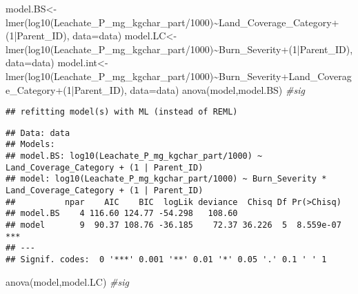 \documentclass[
]{article}
\newenvironment{Shaded}{\begin{snugshade}}{\end{snugshade}}
\newcommand{\AttributeTok}[1]{\textcolor[rgb]{0.77,0.63,0.00}{#1}}
\newcommand{\CommentTok}[1]{\textcolor[rgb]{0.56,0.35,0.01}{\textit{#1}}}
\newcommand{\DecValTok}[1]{\textcolor[rgb]{0.00,0.00,0.81}{#1}}
\newcommand{\FunctionTok}[1]{\textcolor[rgb]{0.00,0.00,0.00}{#1}}
\newcommand{\NormalTok}[1]{#1}
\newcommand{\OtherTok}[1]{\textcolor[rgb]{0.56,0.35,0.01}{#1}}
\newcommand{\SpecialCharTok}[1]{\textcolor[rgb]{0.00,0.00,0.00}{#1}}
\begin{document}
\begin{Shaded}
\begin{Highlighting}[]
\NormalTok{model.BS}\OtherTok{\textless{}{-}}\FunctionTok{lmer}\NormalTok{(}\FunctionTok{log10}\NormalTok{(Leachate\_P\_mg\_kgchar\_part}\SpecialCharTok{/}\DecValTok{1000}\NormalTok{)}\SpecialCharTok{\textasciitilde{}}\NormalTok{Land\_Coverage\_Category}\SpecialCharTok{+}\NormalTok{(}\DecValTok{1}\SpecialCharTok{|}\NormalTok{Parent\_ID), }\AttributeTok{data=}\NormalTok{data)}
\NormalTok{model.LC}\OtherTok{\textless{}{-}}\FunctionTok{lmer}\NormalTok{(}\FunctionTok{log10}\NormalTok{(Leachate\_P\_mg\_kgchar\_part}\SpecialCharTok{/}\DecValTok{1000}\NormalTok{)}\SpecialCharTok{\textasciitilde{}}\NormalTok{Burn\_Severity}\SpecialCharTok{+}\NormalTok{(}\DecValTok{1}\SpecialCharTok{|}\NormalTok{Parent\_ID), }\AttributeTok{data=}\NormalTok{data)}
\NormalTok{model.int}\OtherTok{\textless{}{-}}\FunctionTok{lmer}\NormalTok{(}\FunctionTok{log10}\NormalTok{(Leachate\_P\_mg\_kgchar\_part}\SpecialCharTok{/}\DecValTok{1000}\NormalTok{)}\SpecialCharTok{\textasciitilde{}}\NormalTok{Burn\_Severity}\SpecialCharTok{+}\NormalTok{Land\_Coverage\_Category}\SpecialCharTok{+}\NormalTok{(}\DecValTok{1}\SpecialCharTok{|}\NormalTok{Parent\_ID), }\AttributeTok{data=}\NormalTok{data)}
\FunctionTok{anova}\NormalTok{(model,model.BS) }\CommentTok{\#sig}
\end{Highlighting}
\end{Shaded}

\begin{verbatim}
## refitting model(s) with ML (instead of REML)
\end{verbatim}

\begin{verbatim}
## Data: data
## Models:
## model.BS: log10(Leachate_P_mg_kgchar_part/1000) ~ Land_Coverage_Category + (1 | Parent_ID)
## model: log10(Leachate_P_mg_kgchar_part/1000) ~ Burn_Severity * Land_Coverage_Category + (1 | Parent_ID)
##          npar    AIC    BIC  logLik deviance  Chisq Df Pr(>Chisq)    
## model.BS    4 116.60 124.77 -54.298   108.60                         
## model       9  90.37 108.76 -36.185    72.37 36.226  5  8.559e-07 ***
## ---
## Signif. codes:  0 '***' 0.001 '**' 0.01 '*' 0.05 '.' 0.1 ' ' 1
\end{verbatim}

\begin{Shaded}
\begin{Highlighting}[]
\FunctionTok{anova}\NormalTok{(model,model.LC) }\CommentTok{\#sig}
\end{Highlighting}
\end{Shaded}
\end{document}
